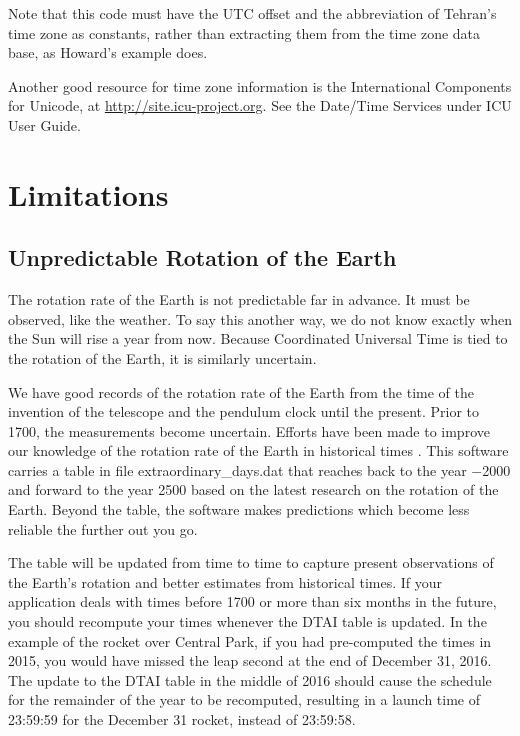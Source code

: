 \documentclass[letterpaper,twoside]{article}
\begin{document}
\inputminted[firstline=27,lastline=84]{Python}{examples/example_07.py}

Note that this code must have the UTC offset and the abbreviation
of Tehran's time zone as constants, rather than extracting them
from the time zone data base, as Howard's example does.

Another good resource for time zone information is
the International Components for Unicode, at
\url{http://site.icu-project.org}.
See the Date/Time Services under ICU User Guide.

\section{Limitations}
\subsection{Unpredictable Rotation of the Earth}
The rotation rate of the Earth is not predictable far in advance.  It must
be observed, like the weather.  To say this another way, we do not know
exactly when the Sun will rise a year from now.  Because Coordinated
Universal Time is tied to the rotation of the Earth, it is similarly
uncertain.

We have good records of the rotation rate of the Earth from the time
of the invention of the telescope and the pendulum clock until
the present.  Prior to 1700, the measurements become uncertain.
Efforts have been made to improve our knowledge of the rotation
rate of the Earth in historical times\citep{2004JHA....35..327M}%
\citep{2005JHA....36..339M}\citep{1997A&A...322..347S}%
\citep{2011ASSP...23....3S}\citep{1986PEPI...44..281M}%
\citep{Stephenson20160404}.
This software carries a table in file {\ttfamily extraordinary\_days.dat}
that reaches back to the year \num{-2000} and forward to
the year \num{2500} based on the latest research on the rotation
of the Earth.
Beyond the table, the software makes predictions which become less
reliable the further out you go.

The table will be updated from time to time to capture present
observations of the Earth's rotation and better estimates from
historical times.  If your application deals with times before
1700 or more than six months in the future, you should recompute
your times whenever the DTAI table is updated.  In the example
of the rocket over Central Park, if you had pre-computed the times
in 2015, you would have missed the leap second at the end of
December 31, 2016.  The update to the DTAI table in the middle
of 2016 should cause the schedule for the remainder of the year
to be recomputed, resulting in a launch time of 23:59:59 for
the December 31 rocket, instead of 23:59:58.
\end{document}
